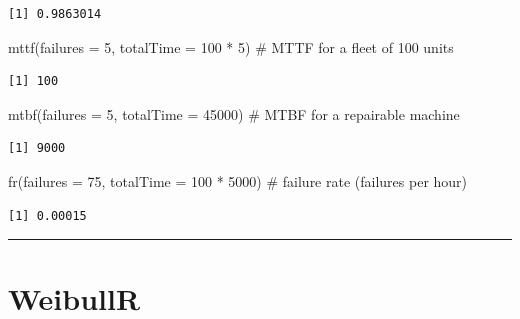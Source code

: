 \documentclass[
  letterpaper,
  DIV=11,
  numbers=noendperiod]{scrreprt}
\newenvironment{Shaded}{\begin{snugshade}}{\end{snugshade}}
\newcommand{\AttributeTok}[1]{\textcolor[rgb]{0.40,0.45,0.13}{#1}}
\newcommand{\CommentTok}[1]{\textcolor[rgb]{0.37,0.37,0.37}{#1}}
\newcommand{\DecValTok}[1]{\textcolor[rgb]{0.68,0.00,0.00}{#1}}
\newcommand{\FunctionTok}[1]{\textcolor[rgb]{0.28,0.35,0.67}{#1}}
\newcommand{\NormalTok}[1]{\textcolor[rgb]{0.00,0.23,0.31}{#1}}
\newcommand{\SpecialCharTok}[1]{\textcolor[rgb]{0.37,0.37,0.37}{#1}}
\begin{document}
\begin{verbatim}
[1] 0.9863014
\end{verbatim}

\begin{Shaded}
\begin{Highlighting}[]
\FunctionTok{mttf}\NormalTok{(}\AttributeTok{failures =} \DecValTok{5}\NormalTok{, }\AttributeTok{totalTime =} \DecValTok{100} \SpecialCharTok{*} \DecValTok{5}\NormalTok{)      }\CommentTok{\# MTTF for a fleet of 100 units}
\end{Highlighting}
\end{Shaded}

\begin{verbatim}
[1] 100
\end{verbatim}

\begin{Shaded}
\begin{Highlighting}[]
\FunctionTok{mtbf}\NormalTok{(}\AttributeTok{failures =} \DecValTok{5}\NormalTok{, }\AttributeTok{totalTime =} \DecValTok{45000}\NormalTok{)        }\CommentTok{\# MTBF for a repairable machine}
\end{Highlighting}
\end{Shaded}

\begin{verbatim}
[1] 9000
\end{verbatim}

\begin{Shaded}
\begin{Highlighting}[]
\FunctionTok{fr}\NormalTok{(}\AttributeTok{failures =} \DecValTok{75}\NormalTok{, }\AttributeTok{totalTime =} \DecValTok{100} \SpecialCharTok{*} \DecValTok{5000}\NormalTok{)    }\CommentTok{\# failure rate (failures per hour)}
\end{Highlighting}
\end{Shaded}

\begin{verbatim}
[1] 0.00015
\end{verbatim}

\begin{center}\rule{0.5\linewidth}{0.5pt}\end{center}

\section*{WeibullR}\label{weibullr-1}

\end{document}
